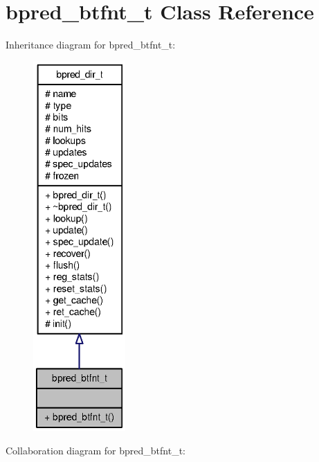 \section{bpred\_\-btfnt\_\-t Class Reference}
\label{classbpred__btfnt__t}
Inheritance diagram for bpred\_\-btfnt\_\-t:\nopagebreak
\begin{figure}[H]
\begin{center}
\leavevmode
\includegraphics[height=400pt]{classbpred__btfnt__t__inherit__graph}
\end{center}
\end{figure}
Collaboration diagram for bpred\_\-btfnt\_\-t:\nopagebreak
